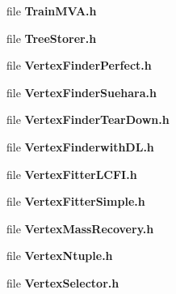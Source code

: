 \begin{DoxyCompactItemize}
\item 
file \textbf{ Train\+M\+V\+A.\+h}
\item 
file \textbf{ Tree\+Storer.\+h}
\item 
file \textbf{ Vertex\+Finder\+Perfect.\+h}
\item 
file \textbf{ Vertex\+Finder\+Suehara.\+h}
\item 
file \textbf{ Vertex\+Finder\+Tear\+Down.\+h}
\item 
file \textbf{ Vertex\+Finderwith\+D\+L.\+h}
\item 
file \textbf{ Vertex\+Fitter\+L\+C\+F\+I.\+h}
\item 
file \textbf{ Vertex\+Fitter\+Simple.\+h}
\item 
file \textbf{ Vertex\+Mass\+Recovery.\+h}
\item 
file \textbf{ Vertex\+Ntuple.\+h}
\item 
file \textbf{ Vertex\+Selector.\+h}
\end{DoxyCompactItemize}
